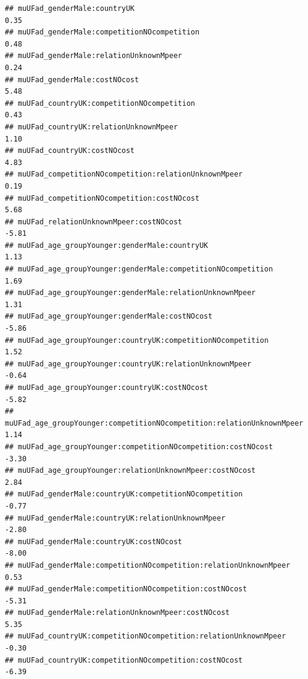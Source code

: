 \documentclass[
]{article}
\begin{document}
\begin{verbatim}
## muUFad_genderMale:countryUK                                                           0.35
## muUFad_genderMale:competitionNOcompetition                                            0.48
## muUFad_genderMale:relationUnknownMpeer                                                0.24
## muUFad_genderMale:costNOcost                                                          5.48
## muUFad_countryUK:competitionNOcompetition                                             0.43
## muUFad_countryUK:relationUnknownMpeer                                                 1.10
## muUFad_countryUK:costNOcost                                                           4.83
## muUFad_competitionNOcompetition:relationUnknownMpeer                                  0.19
## muUFad_competitionNOcompetition:costNOcost                                            5.68
## muUFad_relationUnknownMpeer:costNOcost                                               -5.81
## muUFad_age_groupYounger:genderMale:countryUK                                          1.13
## muUFad_age_groupYounger:genderMale:competitionNOcompetition                           1.69
## muUFad_age_groupYounger:genderMale:relationUnknownMpeer                               1.31
## muUFad_age_groupYounger:genderMale:costNOcost                                        -5.86
## muUFad_age_groupYounger:countryUK:competitionNOcompetition                            1.52
## muUFad_age_groupYounger:countryUK:relationUnknownMpeer                               -0.64
## muUFad_age_groupYounger:countryUK:costNOcost                                         -5.82
## muUFad_age_groupYounger:competitionNOcompetition:relationUnknownMpeer                 1.14
## muUFad_age_groupYounger:competitionNOcompetition:costNOcost                          -3.30
## muUFad_age_groupYounger:relationUnknownMpeer:costNOcost                               2.84
## muUFad_genderMale:countryUK:competitionNOcompetition                                 -0.77
## muUFad_genderMale:countryUK:relationUnknownMpeer                                     -2.80
## muUFad_genderMale:countryUK:costNOcost                                               -8.00
## muUFad_genderMale:competitionNOcompetition:relationUnknownMpeer                       0.53
## muUFad_genderMale:competitionNOcompetition:costNOcost                                -5.31
## muUFad_genderMale:relationUnknownMpeer:costNOcost                                     5.35
## muUFad_countryUK:competitionNOcompetition:relationUnknownMpeer                       -0.30
## muUFad_countryUK:competitionNOcompetition:costNOcost                                 -6.39

\end{verbatim}
\end{document}
